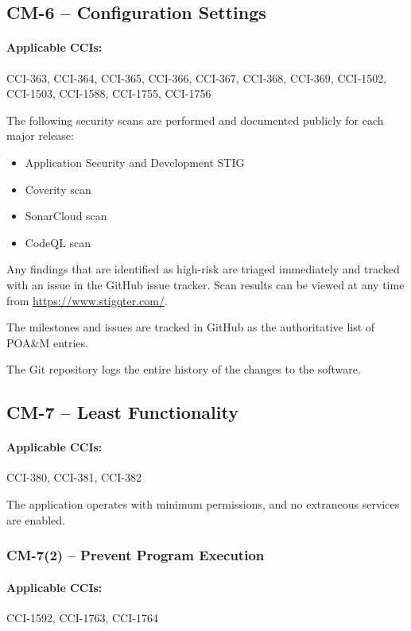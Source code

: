 \documentclass[letterpaper, 10pt, twoside]{article}
\begin{document}
\subsection{CM-6 -- Configuration Settings}

\paragraph{Applicable CCIs:} CCI-363, CCI-364, CCI-365, CCI-366, CCI-367, CCI-368, CCI-369, CCI-1502, CCI-1503, CCI-1588, CCI-1755, CCI-1756

The following security scans are performed and documented publicly for each major release:
\begin{itemize}
	\item Application Security and Development STIG
	\item Coverity scan
	\item SonarCloud scan
	\item CodeQL scan
\end{itemize}

Any findings that are identified as high-risk are triaged immediately and tracked with an issue in the GitHub issue tracker. Scan results can be viewed at any time from \url{https://www.stigqter.com/}.

The milestones and issues are tracked in GitHub as the authoritative list of POA\&M entries.

The Git repository logs the entire history of the changes to the software.

\subsection{CM-7 -- Least Functionality}

\paragraph{Applicable CCIs:} CCI-380, CCI-381, CCI-382

The application operates with minimum permissions, and no extraneous services are enabled.

\subsubsection{CM-7(2) -- Prevent Program Execution}

\paragraph{Applicable CCIs:} CCI-1592, CCI-1763, CCI-1764
\end{document}
